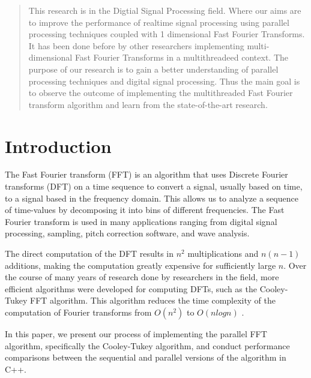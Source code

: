 \documentclass[journal]{IEEEtran}
\begin{document}
\maketitle

\begin{abstract}
This research is in the Digtial Signal Processing field. Where our aims are to improve the performance of realtime
 signal processing using parallel processing techniques coupled with 1 dimensional Fast Fourier Transforms.
 It has been done before by other researchers implementing multi-dimensional Fast Fourier Transforms in a
 multithreadeed context. The purpose of our research is to gain a better understanding of parallel processing
 techniques and digital signal processing. Thus the main goal is to observe the outcome of implementing the
 multithreaded Fast Fourier transform algorithm and learn from the state-of-the-art research.
\end{abstract}

\section{Introduction}
The Fast Fourier transform (FFT) is an algorithm that uses Discrete Fourier transforms (DFT)
on a time sequence to convert a signal, usually based on time, to a signal based
in the frequency domain. This allows us to analyze a sequence of time-values by decomposing
it into bins of different frequencies. The Fast Fourier transform is used in many
applications ranging from digital signal processing, sampling, 
pitch correction software, and wave analysis.

The direct computation of the DFT results in $n^2$ multiplications and $n(n-1)$
additions, making the computation greatly expensive for sufficiently large $n$. 
Over the course of many years of research done by researchers in the field,
more efficient algorithms were developed for computing DFTs, such as the
Cooley-Tukey FFT algorithm. This algorithm reduces the time complexity of the
computation of Fourier transforms from $O(n^2)$ to $O(nlogn)$ \cite{Xiang}.

In this paper, we present our process of implementing the parallel FFT algorithm,
specifically the Cooley-Tukey algorithm, and conduct performance comparisons
between the sequential and parallel versions of the algorithm in C++.
\end{document}

